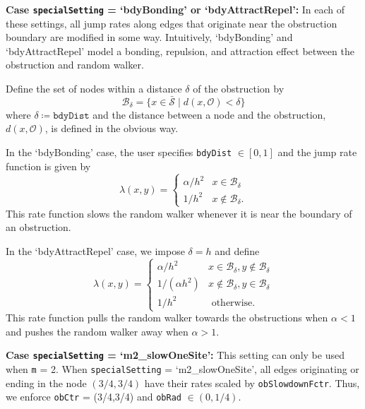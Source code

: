 \documentclass[11pt, oneside]{article}   	%
\theoremstyle{definition}
\newcommand\sS{\mathcal{S}}
\newcommand\oS{\bar{\sS}}
\begin{document}
{\bf Case \texttt{specialSetting} = `bdyBonding' or `bdyAttractRepel':} In each of these settings, all jump rates along edges that originate near the obstruction boundary are modified in some way. Intuitively, `bdyBonding' and `bdyAttractRepel' model a bonding, repulsion, and attraction effect between the obstruction and random walker.

Define the set of nodes within a distance $\delta$ of the obstruction by
\begin{equation}\label{eqn:bdy-nodes}
\mathcal{B}_{\delta} = \{x \in \oS \;|\; d(x,\mathcal{O}) < \delta\}
\end{equation}
where $\delta \coloneqq \texttt{bdyDist}$ and the distance between a node and the obstruction, $d(x,\mathcal{O})$, is defined in the obvious way.

In the `bdyBonding' case, the user specifies \texttt{bdyDist} $\in [0,1]$ and the jump rate function is given by
\begin{equation}\label{eqn:rate-bdyBonding}
	\lambda(x,y) =
	\begin{cases}
		 \alpha/h^2 & x \in \mathcal{B}_{\delta} \\
		 1/h^2 & x \notin \mathcal{B}_{\delta}.
	\end{cases}
\end{equation}
This rate function slows the random walker whenever it is near the boundary of an obstruction.

In the `bdyAttractRepel' case, we impose $\delta = h$ and define
\begin{equation}\label{eqn:rate-bdyAttractRepel}
	\lambda(x,y) =
	\begin{cases}
		 \alpha / h^2 & x \in \mathcal{B}_{\delta}, y \notin \mathcal{B}_{\delta}\\
		 1 / (\alpha h^2) & x \notin \mathcal{B}_{\delta}, y \in \mathcal{B}_{\delta} \\
		 1/h^2 & \text{ otherwise.}
	\end{cases}
\end{equation}
This rate function pulls the random walker towards the obstructions when $\alpha < 1$ and pushes the random walker away when $\alpha > 1$.

{\bf Case \texttt{specialSetting} = `m2\_slowOneSite':}
This setting can only be used when \texttt{m} = 2. When \texttt{specialSetting} = `m2\_slowOneSite', all edges originating or ending in the node $(3/4,3/4)$ have their rates scaled by \texttt{obSlowdownFctr}. Thus, we enforce \texttt{obCtr} = (3/4,3/4) and \texttt{obRad} $\in (0,1/4)$.
\end{document}
